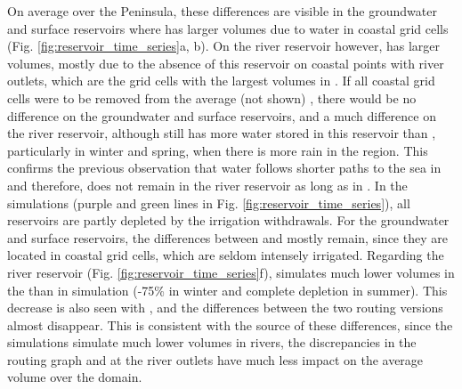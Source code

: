 On average over the Peninsula, these differences are visible in the groundwater and surface reservoirs where \native has larger volumes due to water in coastal grid cells (Fig. \ref{fig:reservoir_time_series}a, b). On the river reservoir however, \std has larger volumes, mostly due to the absence of this reservoir on coastal points with river outlets, which are the grid cells with the largest volumes in \std.
If all coastal grid cells were to be removed from the average (not shown)%
, there would be no difference on the groundwater and surface reservoirs, and a much difference on the river reservoir, although \std still has more water stored in this reservoir than \native, particularly in winter and spring, when there is more rain in the region. This confirms the previous observation that water follows shorter paths to the sea in \native and therefore, does not remain in the river reservoir as long as in \std.
In the \irr simulations (purple and green lines in Fig. \ref{fig:reservoir_time_series}), all reservoirs are partly depleted by the irrigation withdrawals. For the groundwater and surface reservoirs, the differences between \std and \native mostly remain, since they are located in coastal grid cells, which are seldom intensely irrigated.
Regarding the river reservoir (Fig. \ref{fig:reservoir_time_series}f), \std simulates much lower volumes in the \irr than in \noirr simulation (-75\% in winter and complete depletion in summer). This decrease is also seen with \native, and the differences between the two routing versions almost disappear. This is consistent with the source of these differences, since the \irr simulations simulate much lower volumes in rivers, the discrepancies in the routing graph and at the river outlets have much less impact on the average volume over the domain.

